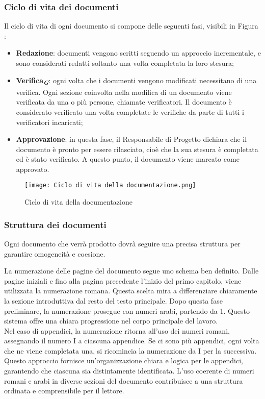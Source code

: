 \subsubsection{Ciclo di vita dei documenti}
Il ciclo di vita di ogni documento si compone delle seguenti fasi, visibili in Figura :
\begin{itemize}
    \item \textbf{Redazione}:  documenti vengono scritti seguendo un approccio incrementale, e sono
    considerati redatti soltanto una volta completata la loro stesura;
    \item \textbf{Verifica}\textsubscript{\textit{\textbf{G}}}: ogni volta che i documenti vengono modificati necessitano di una verifica. 
    Ogni sezione coinvolta nella modifica di un documento viene verificata da una
    o più persone, chiamate verificatori. Il documento è considerato verificato una volta
    completate le verifiche da parte di tutti i verificatori incaricati;
    \item \textbf{Approvazione}: in questa fase, il Responsabile di Progetto dichiara che il documento
    è pronto per essere rilasciato, cioè che la sua stesura è completata ed è stato verificato.
    A questo punto, il documento viene marcato come approvato.
\end{itemize}

\begin{figure}[h]
    \centering
    \texttt{[image: Ciclo di vita della documentazione.png]}
    \caption{Ciclo di vita della documentazione}
    \label{fig:ciclo_vita_documentazione}
\end{figure}


\subsubsection{Struttura dei documenti}
Ogni documento che verrà prodotto dovrà seguire una precisa struttura per garantire 
omogeneità e coesione.

La numerazione delle pagine del documento segue uno schema ben definito. Dalle pagine
iniziali e fino alla pagina precedente l’inizio del primo capitolo, viene utilizzata la numerazione
romana. Questa scelta mira a differenziare chiaramente la sezione introduttiva dal resto
del testo principale. Dopo questa fase preliminare, la numerazione prosegue con numeri
arabi, partendo da 1. Questo sistema offre una chiara progressione nel corpo principale del
lavoro. \\
Nel caso di appendici, la numerazione ritorna all’uso dei numeri romani, assegnando il numero 
I a ciascuna appendice.  Se ci sono più appendici, ogni volta che ne viene completata
una, si ricomincia la numerazione da I per la successiva. Questo approccio fornisce
un’organizzazione chiara e logica per le appendici, garantendo che ciascuna sia distintamente 
identificata. L’uso coerente di numeri romani e arabi in diverse sezioni del documento
contribuisce a una struttura ordinata e comprensibile per il lettore.

